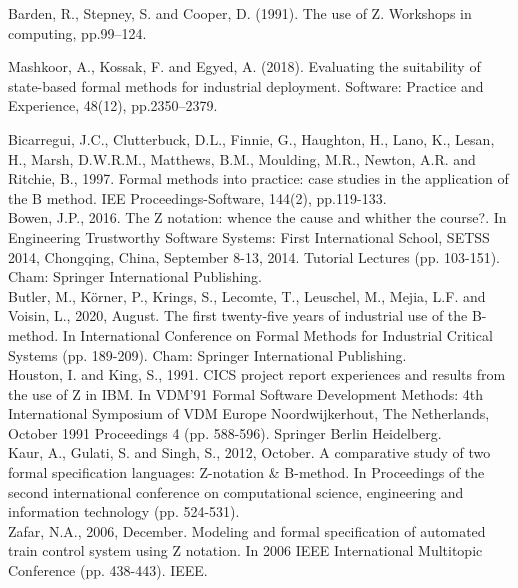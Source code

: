 \documentclass{article}
\begin{document}
Barden, R., Stepney, S. and Cooper, D. (1991). The use of Z. Workshops in computing, pp.99–124.


Mashkoor, A., Kossak, F. and Egyed, A. (2018). Evaluating the suitability of state-based formal methods for industrial deployment. Software: Practice and Experience, 48(12), pp.2350–2379.

Bicarregui, J.C., Clutterbuck, D.L., Finnie, G., Haughton, H., Lano, K., Lesan, H., Marsh, D.W.R.M., Matthews, B.M., Moulding, M.R., Newton, A.R. and Ritchie, B., 1997. Formal methods into practice: case studies in the application of the B method. IEE Proceedings-Software, 144(2), pp.119-133. \\
\newline
Bowen, J.P., 2016. The Z notation: whence the cause and whither the course?. In Engineering Trustworthy Software Systems: First International School, SETSS 2014, Chongqing, China, September 8-13, 2014. Tutorial Lectures (pp. 103-151). Cham: Springer International Publishing. \\
\newline
Butler, M., Körner, P., Krings, S., Lecomte, T., Leuschel, M., Mejia, L.F. and Voisin, L., 2020, August. The first twenty-five years of industrial use of the B-method. In International Conference on Formal Methods for Industrial Critical Systems (pp. 189-209). Cham: Springer International Publishing. \\
\newline
Houston, I. and King, S., 1991. CICS project report experiences and results from the use of Z in IBM. In VDM'91 Formal Software Development Methods: 4th International Symposium of VDM Europe Noordwijkerhout, The Netherlands, October 1991 Proceedings 4 (pp. 588-596). Springer Berlin Heidelberg. \\
\newline
Kaur, A., Gulati, S. and Singh, S., 2012, October. A comparative study of two formal specification languages: Z-notation \& B-method. In Proceedings of the second international conference on computational science, engineering and information technology (pp. 524-531). \\
\newline
Zafar, N.A., 2006, December. Modeling and formal specification of automated train control system using Z notation. In 2006 IEEE International Multitopic Conference (pp. 438-443). IEEE. \\
\end{document}
